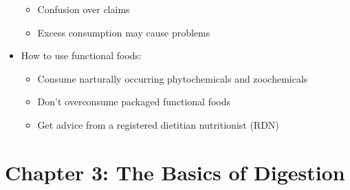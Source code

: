 \documentclass[12pt]{article}
\begin{document}
\begin{itemize}
                    \begin{itemize}
                        \item Confusion over claims
                        \item Excess consumption may cause problems
                    \end{itemize}
                \item How to use functional foods:
                    \begin{itemize}
                        \item Consume narturally occurring phytochemicals and zoochemicals
                        \item Don't overconsume packaged functional foods
                        \item Get advice from a registered dietitian nutritionist (RDN)
                    \end{itemize}
            \end{itemize}

    \section{Chapter 3: The Basics of Digestion}
\end{document}
